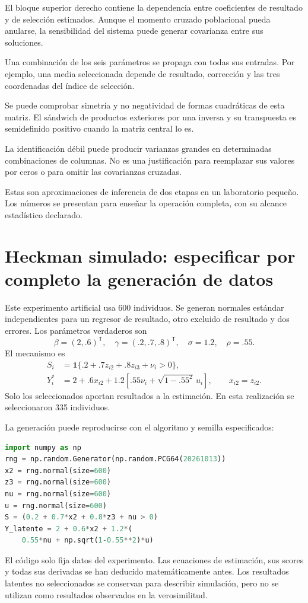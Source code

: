 \documentclass[11pt,a4paper]{article}
\newcommand{\T}{^{\mathsf T}}
\begin{document}
El bloque superior derecho
contiene la dependencia
entre coeficientes de resultado
y de selección estimados.
Aunque el momento cruzado
poblacional pueda anularse,
la sensibilidad del sistema
puede generar covarianza
entre sus soluciones.

Una combinación de los
seis parámetros se
propaga con todas
sus entradas.
Por ejemplo, una media
seleccionada depende de
resultado, corrección y
las tres coordenadas
del índice de selección.

Se puede comprobar simetría
y no negatividad de
formas cuadráticas de
esta matriz.
El sándwich de productos
exteriores por una
inversa y su transpuesta
es semidefinido positivo
cuando la matriz central
lo es.

La identificación débil
puede producir varianzas
grandes en determinadas
combinaciones de columnas.
No es una justificación
para reemplazar sus
valores por ceros
o para omitir
las covarianzas cruzadas.

Estas son aproximaciones
de inferencia de dos etapas
en un laboratorio pequeño.
Los números se presentan
para enseñar la operación
completa, con su alcance
estadístico declarado.

\clearpage
\section{Heckman simulado: especificar por completo la generación de datos}\label{unidad165}
Este experimento artificial usa 600 individuos.
Se generan normales estándar independientes
para un regresor de resultado, otro
excluido de resultado y dos errores.
Los parámetros verdaderos son
\[
\beta=(2,.6)\T,\quad
\gamma=(.2,.7,.8)\T,\quad
\sigma=1.2,\quad\rho=.55.
\]
El mecanismo es
\[
\begin{aligned}
S_i&=\mathbf1\{.2+.7z_{i2}+.8z_{i3}+\nu_i>0\},\\
Y_i^\ast&=2+.6x_{i2}
+1.2[.55\nu_i+\sqrt{1-.55^2}\,u_i],\qquad x_{i2}=z_{i2}.
\end{aligned}
\]
Solo los seleccionados aportan resultados
a la estimación.
En esta realización se seleccionaron 335 individuos.

La generación puede reproducirse con
el algoritmo y semilla especificados:
\begin{lstlisting}[language=Python]
import numpy as np
rng = np.random.Generator(np.random.PCG64(20261013))
x2 = rng.normal(size=600)
z3 = rng.normal(size=600)
nu = rng.normal(size=600)
u = rng.normal(size=600)
S = (0.2 + 0.7*x2 + 0.8*z3 + nu > 0)
Y_latente = 2 + 0.6*x2 + 1.2*(
    0.55*nu + np.sqrt(1-0.55**2)*u)
\end{lstlisting}
El código solo fija datos del experimento.
Las ecuaciones de estimación, sus scores
y todas sus derivadas se han
deducido matemáticamente antes.
Los resultados latentes no seleccionados
se conservan para describir simulación,
pero no se utilizan como resultados
observados en la verosimilitud.
\end{document}
